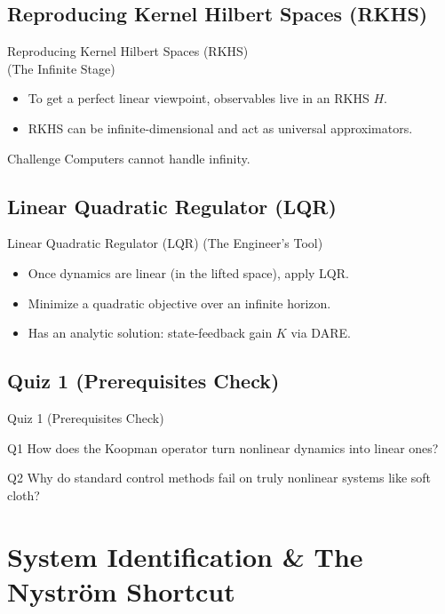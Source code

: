 \documentclass{beamer}
\begin{document}
\subsection{Reproducing Kernel Hilbert Spaces (RKHS)}
\begin{frame}{Reproducing Kernel Hilbert Spaces (RKHS) \\ (The Infinite Stage)}
\begin{itemize}
  \item To get a perfect linear viewpoint, observables live in an RKHS $H$.
  \item RKHS can be infinite-dimensional and act as universal approximators.
\end{itemize}
\begin{alertblock}{Challenge}
Computers cannot handle infinity.
\end{alertblock}
\end{frame}

\subsection{Linear Quadratic Regulator (LQR)}
\begin{frame}{Linear Quadratic Regulator (LQR) (The Engineer's Tool)}
\begin{itemize}
  \item Once dynamics are linear (in the lifted space), apply LQR.
  \item Minimize a quadratic objective over an infinite horizon.
  \item Has an analytic solution: state-feedback gain $K$ via DARE.
\end{itemize}
\end{frame}

\subsection{Quiz 1 (Prerequisites Check)}
\begin{frame}{Quiz 1 (Prerequisites Check)}
\begin{block}{Q1}
How does the Koopman operator turn nonlinear dynamics into linear ones?
\end{block}
\begin{block}{Q2}
Why do standard control methods fail on truly nonlinear systems like soft cloth?
\end{block}
\end{frame}

\section{System Identification \& The Nyström Shortcut}
\end{document}

